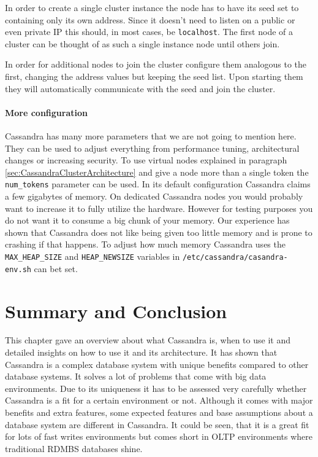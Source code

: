 In order to create a single cluster instance the node has to have its seed set to containing only its own address. Since it doesn't need to listen on a public or even private IP this should, in most cases, be \texttt{localhost}.
The first node of a cluster can be thought of as such a single instance node until others join.

In order for additional nodes to join the cluster configure them analogous to the first, changing the address values but keeping the seed list.
Upon starting them they will automatically communicate with the seed and join the cluster.

\paragraph{More configuration} Cassandra has many more parameters that we are not going to mention here. They can be used to adjust everything from performance tuning, architectural changes or increasing security.
To use virtual nodes explained in paragraph \ref{sec:CassandraClusterArchitecture} and give a node more than a single token the \texttt{num\_tokens} parameter can be used.
In its default configuration Cassandra claims a few gigabytes of memory. On dedicated Cassandra nodes you would probably want to increase it to fully utilize the hardware. However for testing purposes you do not want it to consume a big chunk of your memory. Our experience has shown that Cassandra does not like being given too little memory and is prone to crashing if that happens. To adjust how much memory Cassandra uses the \texttt{MAX\_HEAP\_SIZE} and \texttt{HEAP\_NEWSIZE} variables in \texttt{/etc/cassandra/casandra-env.sh} can bet set.

\section{Summary and Conclusion}
    
This chapter gave an overview about what Cassandra is, when to use it and detailed insights on how to use it and its architecture. It has shown that Cassandra is a complex database system with unique benefits compared to other database systems. It solves a lot of problems that come with big data environments. Due to its uniqueness it has to be assessed very carefully whether Cassandra is a fit for a certain environment or not. Although it comes with major benefits and extra features, some expected features and base assumptions about a database system are different in Cassandra. 
It could be seen, that it is a great fit for lots of fast writes environments but comes short in OLTP environments where traditional RDMBS databases shine.

\cite{cassandra_paper}
